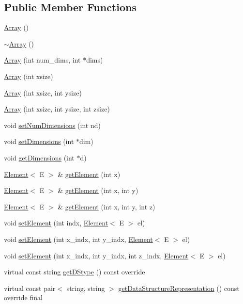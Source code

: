 \subsection*{Public Member Functions}
\begin{DoxyCompactItemize}
\item 
\hyperlink{classbridges_1_1_array_a958421b86ff55303b5fc7d505109f9fe}{Array} ()
\item 
\hyperlink{classbridges_1_1_array_abfca49c36c2b6c63c88010df50f5f49c}{$\sim$\+Array} ()
\item 
\hyperlink{classbridges_1_1_array_a25ff771f9ba7f365465f309ed2dd3688}{Array} (int num\+\_\+dims, int $\ast$dims)
\item 
\hyperlink{classbridges_1_1_array_a0a475058b73b938f0fd3f577365aca89}{Array} (int xsize)
\item 
\hyperlink{classbridges_1_1_array_a13b26fc4d2ccb19b277b2acc615efce2}{Array} (int xsize, int ysize)
\item 
\hyperlink{classbridges_1_1_array_a3504e71cacffd343edf8b9ea16f75eb4}{Array} (int xsize, int ysize, int zsize)
\item 
void \hyperlink{classbridges_1_1_array_a6b91612bb7b89a563571fd1ea417ef2a}{set\+Num\+Dimensions} (int nd)
\item 
void \hyperlink{classbridges_1_1_array_a4e179915ab7820bbafe9b3433656b182}{set\+Dimensions} (int $\ast$dim)
\item 
void \hyperlink{classbridges_1_1_array_ae195a6f06157e82c68483ff636e30f5e}{get\+Dimensions} (int $\ast$d)
\item 
\hyperlink{classbridges_1_1_element}{Element}$<$ E $>$ \& \hyperlink{classbridges_1_1_array_a8b4c6cc491829d814e0b6b0ce3654417}{get\+Element} (int x)
\item 
\hyperlink{classbridges_1_1_element}{Element}$<$ E $>$ \& \hyperlink{classbridges_1_1_array_acd5e730e0369b1fa699a5907e889f213}{get\+Element} (int x, int y)
\item 
\hyperlink{classbridges_1_1_element}{Element}$<$ E $>$ \& \hyperlink{classbridges_1_1_array_a7006eeac547c391cb7e8eb19c56ae9f6}{get\+Element} (int x, int y, int z)
\item 
void \hyperlink{classbridges_1_1_array_aae8ec0bd850e00593487022bc914afe0}{set\+Element} (int indx, \hyperlink{classbridges_1_1_element}{Element}$<$ E $>$ el)
\item 
void \hyperlink{classbridges_1_1_array_a428cc76d22af71c5ae57dc293780b8ec}{set\+Element} (int x\+\_\+indx, int y\+\_\+indx, \hyperlink{classbridges_1_1_element}{Element}$<$ E $>$ el)
\item 
void \hyperlink{classbridges_1_1_array_a526c3a190b48a338541e5b4667c5eedf}{set\+Element} (int x\+\_\+indx, int y\+\_\+indx, int z\+\_\+indx, \hyperlink{classbridges_1_1_element}{Element}$<$ E $>$ el)
\item 
virtual const string \hyperlink{classbridges_1_1_array_afe4174bc21eaafa316584894cf4732b1}{get\+D\+Stype} () const  override
\item 
virtual const pair$<$ string, string $>$ \hyperlink{classbridges_1_1_array_adc13651f1b228d222772e2f5df16229b}{get\+Data\+Structure\+Representation} () const  override final
\end{DoxyCompactItemize}
